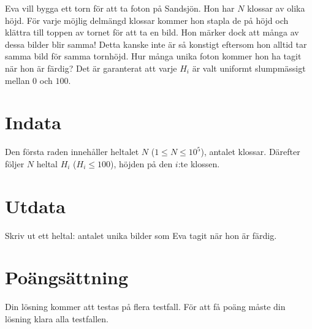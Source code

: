 Eva vill bygga ett torn för att ta foton på Sandsjön. Hon har $N$ klossar av olika höjd.
För varje möjlig delmängd klossar kommer hon stapla de på höjd och klättra till toppen av tornet
för att ta en bild. Hon märker dock att många av dessa bilder blir samma! Detta kanske inte är så konstigt eftersom hon alltid tar samma bild för samma tornhöjd. Hur många unika foton kommer hon ha tagit när hon är färdig? 
Det är garanterat att varje $H_i$ är valt uniformt slumpmässigt mellan $0$ och $100$.

\section*{Indata}
Den första raden innehåller heltalet $N$ ($1 \leq N \leq 10^5$), antalet klossar.
Därefter följer $N$ heltal $H_i$ ($H_i \leq 100$), höjden på den $i$:te klossen.
\section*{Utdata}
Skriv ut ett heltal: antalet unika bilder som Eva tagit när hon är färdig.

\section*{Poängsättning}
Din lösning kommer att testas på flera testfall.
För att få poäng måste din lösning klara alla testfallen.
